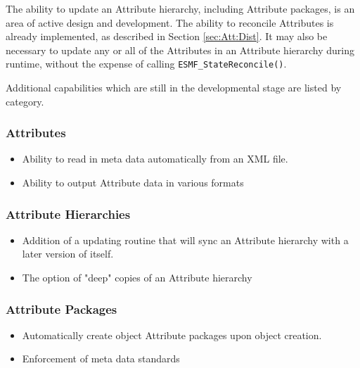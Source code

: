 %

The ability to update an Attribute hierarchy, including Attribute packages, is an area of active design and development.  The ability to reconcile Attributes is already implemented, as described in Section \ref{sec:Att:Dist}.  It may also be necessary to update any or all of the Attributes in an Attribute hierarchy during runtime, without the expense of calling {\tt ESMF\_StateReconcile()}.  

Additional capabilities which are still in the developmental stage are listed by category.
 
\subsubsection{Attributes}

\begin{itemize}
\item Ability to read in meta data automatically from an XML file.
\item Ability to output Attribute data in various formats
\end{itemize}

\subsubsection{Attribute Hierarchies}

\begin{itemize}
\item Addition of a updating routine that will sync an Attribute hierarchy with a later version of itself.
\item The option of "deep" copies of an Attribute hierarchy
\end{itemize}

\subsubsection{Attribute Packages}

\begin{itemize}
\item Automatically create object Attribute packages upon object creation.
\item Enforcement of meta data standards
\end{itemize}
